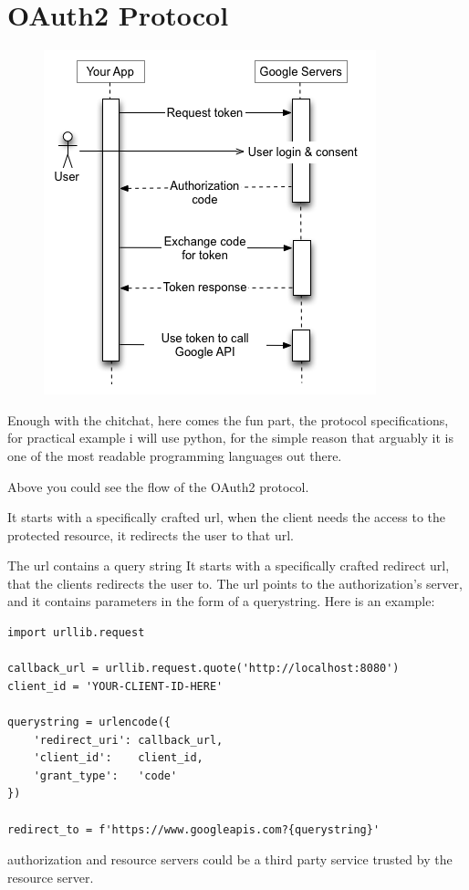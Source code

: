 \documentclass[11pt]{style}
\begin{document}
\section{OAuth2 Protocol}
\begin{figure}[h]
    \centering
    \includegraphics[width=.5\textwidth]{authorization-code.png}
\end{figure}

Enough with the chitchat, here comes the fun part, the protocol specifications,
for practical example i will use python, for the simple reason that arguably it
is one of the most readable programming languages out there.

Above you could see the flow of the OAuth2 protocol.

It starts with a specifically crafted url, when the client needs the access to
the protected resource, it redirects the user to that url.

The url contains a query string
It starts with a specifically crafted redirect url, that the clients
redirects the user to.
The url points to the authorization's server, and it contains parameters in the
form of a querystring. Here is an example:

\begin{lstlisting}
import urllib.request

callback_url = urllib.request.quote('http://localhost:8080')
client_id = 'YOUR-CLIENT-ID-HERE'

querystring = urlencode({
    'redirect_uri': callback_url,
    'client_id':    client_id,
    'grant_type':   'code'
})

redirect_to = f'https://www.googleapis.com?{querystring}'
\end{lstlisting}


authorization and resource servers could be a third party service trusted by the
resource server.
\end{document}
